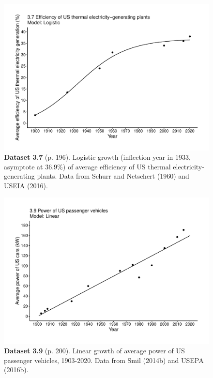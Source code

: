 \documentclass[aps,rmp,preprint,superscriptaddress,10pt,onecolumn]{article}
\begin{document}
\clearpage
\begin{figure}[h]
\includegraphics[width=\textwidth]{output/figs-ggplot/3.7.pdf}
\caption*{\textbf{Dataset 3.7} (p. 196). Logistic growth (inflection year in 1933, asymptote at 36.9\%) of average efficiency of US thermal electricity-generating plants. Data from Schurr and Netschert (1960) and USEIA (2016).}
\end{figure}
	
\clearpage
\begin{figure}[h]
\includegraphics[width=\textwidth]{output/figs-ggplot/3.9.pdf}
\caption*{\textbf{Dataset 3.9} (p. 200). Linear growth of average power of US passenger vehicles, 1903-2020. Data from Smil (2014b) and USEPA (2016b).}
\end{figure}
	
\end{document}
